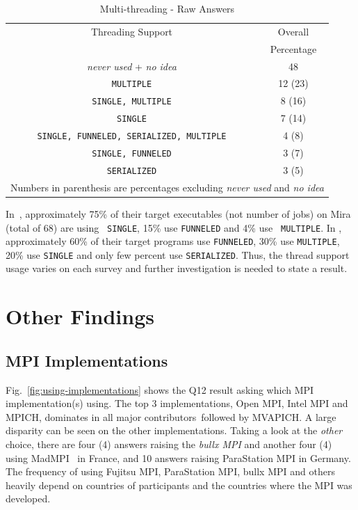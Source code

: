\documentclass[preprint,5p,times]{elsarticle}
\def\myquote#1{{\it #1}}
\def\mcountries{major contributors}%
\begin{document}
\begin{table}[htb]%
  \begin{center}%
    \caption{Multi-threading - Raw Answers}\label{tab:multi-thread-raw}%
    \begin{tabular}{c|c}%
      \hline%
      Threading Support & Overall \\
      & Percentage \\
      \hline%
      \myquote{never used} + \myquote{no idea} & 48 \\
              {\tt MULTIPLE} & 12 (23) \\
              {\tt SINGLE, MULTIPLE} & 8 (16) \\
              {\tt SINGLE} & 7 (14) \\
              {\small\tt SINGLE, FUNNELED, SERIALIZED, MULTIPLE} & 4 (8) \\
              {\tt SINGLE, FUNNELED} & 3 (7) \\
              {\tt SERIALIZED} & 3 (5) \\
              \hline%
              \multicolumn{2}{c}{\footnotesize Numbers in parenthesis are
                percentages excluding \myquote{never used} and \myquote{no
                  idea}}
    \end{tabular}%
  \end{center}%
\end{table}%

In~\cite{8665758}, approximately 75\% of their target
executables (not number of jobs) on Mira (total of 68) are using {\tt
  SINGLE}, 15\% use {\tt FUNNELED} and 4\% use {\tt
  MULTIPLE}. In \cite{10.1145/3295500.3356176}, approximately 60\% of
their target programs use {\tt FUNNELED}, 30\% use {\tt MULTIPLE}, 20\%
use {\tt SINGLE} and only few percent use {\tt SERIALIZED}. Thus, the
thread support usage varies on each survey and further investigation
is needed to state a result.

\section{Other Findings}

\subsection{MPI Implementations}

  Fig.~\ref{fig:using-implementations} shows the Q12 result asking
  which MPI implementation(s) using. The top 3
  implementations, Open MPI, Intel MPI and MPICH, dominates in all
  \mcountries\  followed by MVAPICH. A large disparity can be
  seen on the other implementations. Taking a
  look at the \myquote{other} choice, there are four (4) answers raising the
  \myquote{bullx MPI} and another four (4) using MadMPI~\cite{madmpi} in
  France, and 10
  answers raising ParaStation MPI in Germany. The frequency of using
  Fujitsu MPI, ParaStation MPI, bullx MPI and others heavily depend on
  countries of participants and the countries where the MPI was
  developed.
\end{document}
